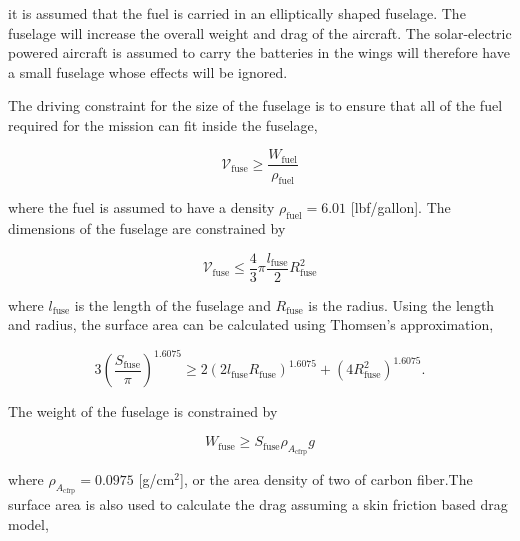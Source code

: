 
\subsubsection{}

\DIFaddend it is assumed that the fuel is carried in an elliptically shaped fuselage.  The fuselage will increase the overall weight and drag of the aircraft.  The solar-electric powered aircraft is assumed to carry the batteries in the wings will therefore have a small fuselage whose effects will be ignored.  

The driving constraint for the size of the fuselage is to ensure that all of the fuel required for the mission can fit inside the fuselage, 

\begin{equation}
    \label{e:fusevol}
    \mathcal{V}_{\text{fuse}} \geq \frac{W_\text{fuel}}{\rho_\text{fuel}}
\end{equation}

where the fuel is assumed to have a density $\rho_\text{fuel} = 6.01$ [lbf/gallon].  The dimensions of the fuselage are constrained by

\begin{equation}
    \label{e:fusevol2}
    \mathcal{V}_{\text{fuse}} \leq \frac{4}{3}\pi \frac{l_{\text{fuse}}}{2}R_{\text{fuse}}^2
\end{equation}

where $l_{\text{fuse}}$ is the length of the fuselage and $R_{\text{fuse}}$ is the radius. Using the length and radius, the surface area can be calculated using Thomsen's approximation,\cite{ellipsoidSA}

\begin{equation}
    \label{e:fusesa}
    3 \left( \frac{S_{\text{fuse}}}{\pi} \right)^{1.6075} \geq 2(2l_{\text{fuse}}R_{\text{fuse}})^{1.6075} + (4R_{\text{fuse}}^2)^{1.6075}.
\end{equation}

The weight of the fuselage is constrained by

\begin{equation}
    \label{e:fuseweight}
    W_{\text{fuse}} \geq S_{\text{fuse}} \rho_{A_{\text{cfrp}}} g
\end{equation} 

where $\rho_{A_{\text{cfrp}}} = 0.0975$ [g/cm$^2$], or the area density of two \DIFdelbegin {}\DIFdelend \DIFaddbegin {}\DIFaddend of carbon fiber.\DIFdelbegin {}\DIFdelend \DIFaddbegin {}\DIFaddend The surface area is also used to calculate the drag assuming a skin friction based drag model,


